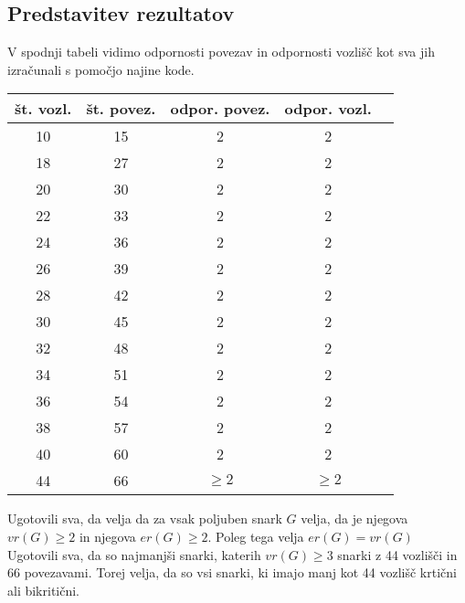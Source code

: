 \documentclass[a4paper, 10pt]{article}
\begin{document}
\subsection*{Predstavitev rezultatov}

V spodnji tabeli vidimo odpornosti povezav in odpornosti vozlišč kot sva
jih izračunali s pomočjo najine kode.

\begin{center}
    \begin{tabular}{|c|c|c|c|c|}
        \hline
        št. vozl. & št. povez. & odpor. povez. & odpor. vozl. \\
        \hline
        10 & 15 & 2 & 2 \\ 
        \hline
        18 & 27 & 2 & 2 \\
        \hline
        20 & 30 & 2 & 2 \\
        \hline
        22 & 33 & 2 & 2 \\
        \hline
        24 & 36 & 2 & 2 \\
        \hline
        26 & 39 & 2 & 2\\
        \hline 
        28 & 42 & 2 & 2 \\
        \hline
        30 & 45 & 2 & 2 \\
        \hline
        32 & 48 & 2 & 2 \\
        \hline
        34 & 51 & 2 & 2 \\
        \hline
        36 & 54 & 2 & 2 \\
        \hline
        38 & 57 & 2 & 2 \\
        \hline
        40 & 60 & 2 & 2 \\
        \hline
        44 & 66 & $ \ge 2$ & $ \ge 2$ \\
        \hline
    \end{tabular}
    \end{center}

Ugotovili sva, da velja da za vsak poljuben snark $G$ velja, da je njegova $vr(G) \ge 2$ in
njegova $er(G) \ge 2$. Poleg tega velja $er(G) = vr(G) $ Ugotovili sva, da so najmanjši
snarki, katerih $vr(G) \ge 3$ snarki z 44 vozlišči in 66 povezavami. Torej velja, da so vsi snarki,
ki imajo manj kot 44 vozlišč krtični ali bikritični.




\pagebreak
\end{document}
